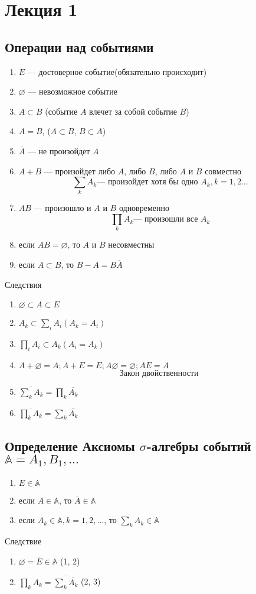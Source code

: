 
\newpage
\section{Лекция 1}
\subsection{Операции над событиями}
\begin{enumerate}
	\item $E$ --- достоверное событие(обязательно происходит)
	\item $\varnothing$ --- невозможное событие
	\item $A \subset B$ (событие $A$ влечет за собой событие $B$)
	\item $A = B$, ($A \subset B$, $B \subset A$)
	\item $\overline{A}$ --- не произойдет $A$
	\item $A + B$ --- произойдет либо $A$, либо $B$, либо $A$ и $B$ совместно
		\[
			\sum_k A_k \text{--- произойдет хотя бы одно } A_k, k = 1, 2 \ldots		
		\]
	\item  $AB$ --- произошло и $A$ и $B$ одновременно
		\[
			\prod_k A_k \text{--- произошли все } A_k		
		\]
	\item если $AB = \varnothing$, то $A$ и $B$ несовместны
	\item если $A \subset B$, то $B - A = B \overline{A}$
\end{enumerate}
Следствия
\begin{enumerate}
	\item $\varnothing \subset A \subset E$
	\item $A_k \subset \sum_i A_i (A_k = A_i)$
	\item $\prod_i A_i \subset A_k (A_i = A_k)$
	\item $ A + \varnothing = A; A + E = E; A\varnothing = \varnothing; AE = A$
		\[
\textsf{Закон двойственности	}
		\]
	\item $\overline{\sum_k A_k} = \prod_k \overline{A_k}$
	\item $\overline{\prod_k A_k} = \sum_k \overline{A_k}$
\end{enumerate}

\subsection{Определение Аксиомы $\sigma$-алгебры событий $\mathbb{A} = {A_1, B_1, \ldots}$}
\begin{enumerate}
	\item $E \in \mathbb{A}$
	\item если $A \in \mathbb{A}$, то $\overline{A} \in \mathbb{A}$
	\item если $A_k \in \mathbb{A}, k = 1, 2, \ldots$, то $\sum_k A_k \in \mathbb{A}$
\end{enumerate}
Следствие
\begin{enumerate}
	\item $\varnothing = \overline{E} \in \mathbb{A}$ (1, 2)
	\item $\prod_k A_k = \overline{\sum_k \overline{A_k}}$ (2, 3)
\end{enumerate}

